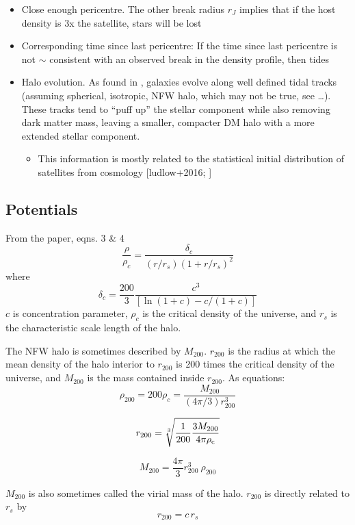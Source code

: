 \begin{itemize}
\tightlist
\item
  Close enough pericentre. The other break radius \(r_J\) implies that
  if the host density is 3x the satellite, stars will be lost
\item
  Corresponding time since last pericentre: If the time since last
  pericentre is not \(\sim\) consistent with an observed break in the
  density profile, then tides
\item
  Halo evolution. As found in \citet{EN2021}, galaxies evolve along well
  defined tidal tracks (assuming spherical, isotropic, NFW halo, which
  may not be true, see \ldots). These tracks tend to ``puff up'' the
  stellar component while also removing dark matter mass, leaving a
  smaller, compacter DM halo with a more extended stellar component.

  \begin{itemize}
  \tightlist
  \item
    This information is mostly related to the statistical initial
    distribution of satellites from cosmology {[}ludlow+2016;
    \citet{fattahi+2018}{]}
  \end{itemize}
\end{itemize}

\subsection{Potentials}\label{potentials}

From the \citet{nfw1996} paper, eqns. 3 \& 4 \[
\frac{\rho}{\rho_c} = \frac{\delta_c}{(r/r_s)(1+r/r_s)^2}
\] where \[
\delta_c = \frac{200}{3}\frac{c^3}{[\ln(1+c)-c/(1+c)]}
\] \(c\) is concentration parameter, \(\rho_c\) is the critical density
of the universe, and \(r_s\) is the characteristic scale length of the
halo.

The NFW halo is sometimes described by \(M_{200}\). \(r_{200}\) is the
radius at which the mean density of the halo interior to \(r_{200}\) is
200 times the critical density of the universe, and \(M_{200}\) is the
mass contained inside \(r_{200}\). As equations: \[
\rho_{200} = 200\rho_{c} = \frac{M_{200}}{(4\pi/3) r_{200}^3}
\]

\[
r_{200} = \sqrt[3]{\frac{1}{200}\frac{3M_{200}}{4\pi \rho_{\rm c
}}}
\]

\[
M_{200} = \frac{4\pi}{3} r_{200}^3\ \rho_{200}
\]

\(M_{200}\) is also sometimes called the virial mass of the halo.
\(r_{200}\) is directly related to \(r_s\) by \[
r_{200} = c\,r_s
\]

